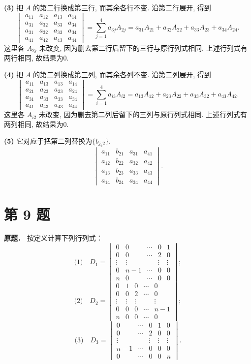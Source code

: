 \documentclass[UTF8,12pt]{ctexart}
\begin{document}
\textbf{(3)} 把 $A$ 的第二行换成第三行, 而其余各行不变. 沿第二行展开, 得到
\[
\begin{vmatrix}
a_{11}&a_{12}&a_{13}&a_{14}\\
a_{31}&a_{32}&a_{33}&a_{34}\\
a_{31}&a_{32}&a_{33}&a_{34}\\
a_{41}&a_{42}&a_{43}&a_{44}
\end{vmatrix}
=\sum_{j=1}^{4}a_{3j}A_{2j}
=a_{31}A_{21}+a_{32}A_{22}+a_{33}A_{23}+a_{34}A_{24}.
\]
这里各 $A_{2j}$ 未改变, 因为删去第二行后留下的三行与原行列式相同. 上述行列式有两行相同, 故结果为0.

\textbf{(4)} 把 $A$ 的第二列换成第三列, 而其余各列不变. 沿第二列展开, 得到
\[
\begin{vmatrix}
a_{11}&a_{13}&a_{13}&a_{14}\\
a_{21}&a_{23}&a_{23}&a_{24}\\
a_{31}&a_{33}&a_{33}&a_{34}\\
a_{41}&a_{43}&a_{43}&a_{44}
\end{vmatrix}
=\sum_{i=1}^{4}a_{i3}A_{i2}
=a_{13}A_{12}+a_{23}A_{22}+a_{33}A_{32}+a_{43}A_{42}.
\]
这里各 $A_{i2}$ 未改变, 因为删去第二列后留下的三列与原行列式相同. 上述行列式有两列相同, 故结果为0.

\textbf{(5)}  它对应于把第二列替换为$\{b_{j_2 2}\}$.
\[
\begin{vmatrix}
a_{11}&b_{21}&a_{31}&a_{41}\\
a_{12}&b_{22}&a_{32}&a_{42}\\
a_{13}&b_{23}&a_{33}&a_{43}\\
a_{14}&b_{24}&a_{34}&a_{44}
\end{vmatrix}.
\]

\section*{第 9 题}

\textbf{原题．} 按定义计算下列行列式：
\[
\text{(1)}\quad
D_1=\begin{vmatrix}
0&0&\cdots&0&1\\
0&0&\cdots&2&0\\
\vdots&\vdots&&\vdots&\vdots\\
0&n-1&\cdots&0&0\\
n&0&\cdots&0&0
\end{vmatrix};
\]
\[
\text{(2)}\quad
D_2=\begin{vmatrix}
0&1&0&\cdots&0\\
0&0&2&\cdots&0\\
\vdots&\vdots&\vdots&&\vdots\\
0&0&0&\cdots&n-1\\
n&0&0&\cdots&0
\end{vmatrix};
\]
\[
\text{(3)}\quad
D_3=\begin{vmatrix}
0&\cdots&0&1&0\\
0&\cdots&2&0&0\\
\vdots&&\vdots&\vdots&\vdots\\
n-1&\cdots&0&0&0\\
0&\cdots&0&0&n
\end{vmatrix}.
\]
\end{document}
